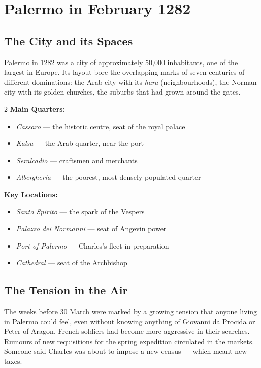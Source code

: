 \secsep

\section{Palermo in February 1282}

\subsection{The City and its Spaces}

Palermo in 1282 was a city of approximately 50,000 inhabitants, one of
the largest in Europe. Its layout bore the overlapping marks of seven
centuries of different dominations: the Arab city with its \textit{hara}
(neighbourhoods), the Norman city with its golden churches, the suburbs
that had grown around the gates.

\begin{multicols}{2}
\noindent\textbf{Main Quarters:}
\begin{itemize}[leftmargin=*, nosep]
  \item \textit{Cassaro} — the historic centre, seat of the royal palace
  \item \textit{Kalsa} — the Arab quarter, near the port
  \item \textit{Seralcadio} — craftsmen and merchants
  \item \textit{Albergheria} — the poorest, most densely populated quarter
\end{itemize}

\columnbreak

\noindent\textbf{Key Locations:}
\begin{itemize}[leftmargin=*, nosep]
  \item \textit{Santo Spirito} — the spark of the Vespers
  \item \textit{Palazzo dei Normanni} — seat of Angevin power
  \item \textit{Port of Palermo} — Charles's fleet in preparation
  \item \textit{Cathedral} — seat of the Archbishop
\end{itemize}
\end{multicols}

\subsection{The Tension in the Air}

The weeks before 30 March were marked by a growing tension that anyone
living in Palermo could feel, even without knowing anything of Giovanni
da Procida or Peter of Aragon. French soldiers had become more aggressive
in their searches. Rumours of new requisitions for the spring expedition
circulated in the markets. Someone said Charles was about to impose a new
census — which meant new taxes.

